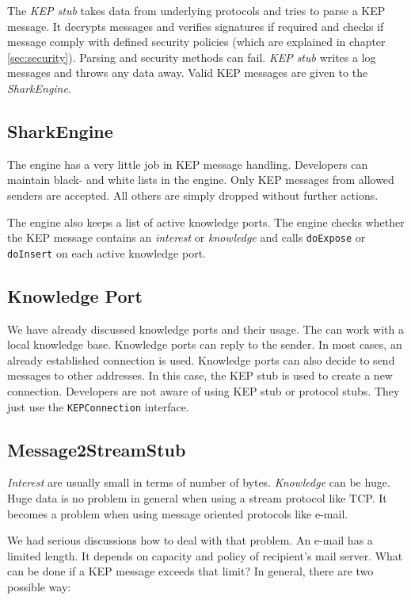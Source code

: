 The {\it KEP stub} takes data from underlying protocols and tries to parse a KEP message. It decrypts messages and verifies signatures if required and checks if message comply with defined security policies (which are explained in chapter \ref{sec:security}). Parsing and security methods can fail. {\it KEP stub} writes a log messages and throws any data away. Valid KEP messages are given to the {\it SharkEngine}. 

\subsection{SharkEngine}
The engine has a very little job in KEP message handling. Developers can maintain black- and white lists in the engine. Only KEP messages from allowed senders are accepted. All others are simply dropped without further actions.

The engine also keeps a list of active knowledge ports. The engine checks whether the KEP message contains an {\it interest} or {\it knowledge} and calls {\tt doExpose} or {\tt doInsert} on each active knowledge port.

\subsection{Knowledge Port}
We have already discussed knowledge ports and their usage. The can work with a local knowledge base. Knowledge ports can reply to the sender. In most cases, an already established connection is used. Knowledge ports can also decide to send messages to other addresses. In this case, the KEP stub is used to create a new connection. Developers are not aware of using KEP stub or protocol stubs. They just use the {\tt KEPConnection} interface.

\subsection{Message2StreamStub}
{\it Interest} are usually small in terms of number of bytes. {\it Knowledge} can be huge. Huge data is no problem in general when using a stream protocol like TCP. It becomes a problem when using message oriented protocols like e-mail. 

We had serious discussions how to deal with that problem. An e-mail has a limited length. It depends on capacity and policy of recipient's mail server. What can be done if a KEP message exceeds that limit? In general, there are two possible way:

